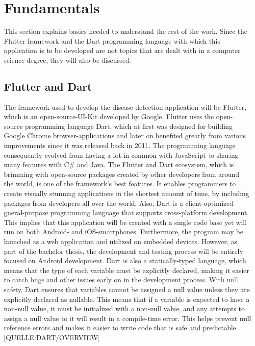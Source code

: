 

\chapter{Fundamentals}
This section explains basics needed to understand the rest of the work. Since the Flutter framework and the Dart programming language with which this application is to be developed are not topics that are dealt with in a computer science degree, they will also be discussed.
\section{Flutter and Dart}
The framework used to develop the disease-detection application will be Flutter, which is an open-source-UI-Kit developed by Google. Flutter uses the open-source programming language Dart, which at first was designed for building Google Chrome browser-applications and later on benefited greatly from various improvements since it was released back in 2011. The programming language consequently evolved from having a lot in common with JavaScript to sharing many features with C\# and Java. The Flutter and Dart ecosystem, which is brimming with open-source packages created by other developers from around the world, is one of the framework's best features. It enables programmers to create visually stunning applications in the shortest amount of time, by including packages from developers all over the world. Also, Dart is a client-optimized gneral-purpose programming language that supports cross-platform development. This implies that this application will be created with a single code base yet will run on both Android- and iOS-smartphones. Furthermore, the program may be launched as a web application and utilized on embedded devices. However, as part of the bachelor thesis, the development and testing process will be entirely focused on Android development. Dart is also a statically-typed language, which means that the type of each variable must be explicitly declared, making it easier to catch bugs and other issues early on in the development process. With null safety, Dart ensures that variables cannot be assigned a null value unless they are explicitly declared as nullable. This means that if a variable is expected to have a non-null value, it must be initialized with a non-null value, and any attempts to assign a null value to it will result in a compile-time error. This helps prevent null reference errors and makes it easier to write code that is safe and predictable. [QUELLE:DART/OVERVIEW]

